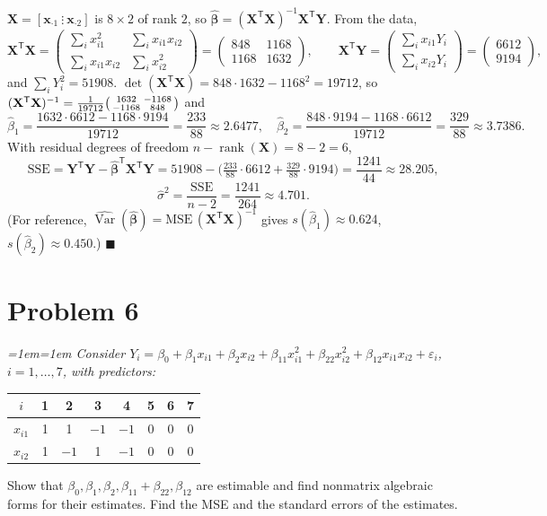 \documentclass[11pt]{article}
\DeclareMathOperator{\rank}{rank}
\DeclareMathOperator{\Var}{Var}
\newcommand{\bX}{\mathbf{X}}
\newcommand{\bY}{\mathbf{Y}}
\newcommand{\bx}{\mathbf{x}}
\newcommand{\bbeta}{\bm{\beta}}
\newcommand{\T}{^{\mathsf{T}}}
\newcommand{\inv}{^{-1}}
\newcommand{\bhat}[1]{\widehat{#1}}
\theoremstyle{remark}
\newenvironment{question}%
  {\smallskip\itshape\leftskip=1em\rightskip=1em\relax}%
  {\par\smallskip\noindent\hrulefill\par}
\begin{document}
$\bX=[\bx_{\cdot1}\ \vdots\ \bx_{\cdot2}]$ is $8\times2$ of rank $2$, so
$\bhat{\bbeta}=(\bX\T\bX)\inv\bX\T\bY$. From the data,
\[
\bX\T\bX=\begin{pmatrix}\sum_i x_{i1}^2 & \sum_i x_{i1}x_{i2}\\[2pt] \sum_i x_{i1}x_{i2}&\sum_i x_{i2}^2\end{pmatrix}
=\begin{pmatrix}848&1168\\ 1168&1632\end{pmatrix},\qquad
\bX\T\bY=\begin{pmatrix}\sum_i x_{i1}Y_i\\[2pt] \sum_i x_{i2}Y_i\end{pmatrix}=\begin{pmatrix}6612\\ 9194\end{pmatrix},
\]
and $\sum_i Y_i^2=51908$.
$\det(\bX\T\bX)=848\cdot1632-1168^2=19712$, so
$(\bX\T\bX)\inv=\tfrac{1}{19712}\begin{psmallmatrix}1632&-1168\\ -1168&848\end{psmallmatrix}$ and
\[
\hat\beta_1=\frac{1632\cdot6612-1168\cdot9194}{19712}=\frac{233}{88}\approx2.6477,\quad
\hat\beta_2=\frac{848\cdot9194-1168\cdot6612}{19712}=\frac{329}{88}\approx3.7386.
\]
With residual degrees of freedom $n-\rank(\bX)=8-2=6$,
\[
\mathrm{SSE}=\bY\T\bY-\bhat{\bbeta}\T\bX\T\bY
=51908-\Big(\tfrac{233}{88}\cdot6612+\tfrac{329}{88}\cdot9194\Big)=\frac{1241}{44}\approx28.205,
\]
\[
\bhat\sigma^2=\frac{\mathrm{SSE}}{n-2}=\frac{1241}{264}\approx4.701.
\]
(For reference, $\widehat{\Var}(\bhat{\bbeta})=\mathrm{MSE}\,(\bX\T\bX)\inv$ gives
$s(\hat\beta_1)\approx0.624$, $s(\hat\beta_2)\approx0.450$.) \hfill$\blacksquare$

\section*{Problem 6}

\begin{question}
Consider $Y_i=\beta_0+\beta_1x_{i1}+\beta_2x_{i2}+\beta_{11}x_{i1}^2+\beta_{22}x_{i2}^2
+\beta_{12}x_{i1}x_{i2}+\varepsilon_i$, $i=1,\dots,7$, with predictors:
\par\smallskip\centering\upshape
\begin{tabular}{c|ccccccc}
$i$ & 1&2&3&4&5&6&7\\\hline
$x_{i1}$ & 1&1&$-1$&$-1$&0&0&0\\
$x_{i2}$ & 1&$-1$&1&$-1$&0&0&0
\end{tabular}
\par\smallskip\upshape\raggedright
Show that $\beta_0,\beta_1,\beta_2,\beta_{11}+\beta_{22},\beta_{12}$ are estimable and find nonmatrix
algebraic forms for their estimates. Find the MSE and the standard errors of the estimates.
\end{question}
\end{document}
